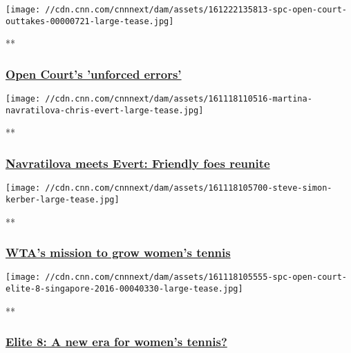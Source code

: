 \texttt{[image: //cdn.cnn.com/cnnnext/dam/assets/161222135813-spc-open-court-outtakes-00000721-large-tease.jpg]}

**

\hypertarget{open-courts-unforced-errors}{%
\subsubsection{\texorpdfstring{\href{/videos/sports/2016/12/22/spc-open-court-outtakes.cnn}{Open
Court's 'unforced
errors'}}{Open Court's 'unforced errors'}}\label{open-courts-unforced-errors}}

\href{/videos/sports/2016/11/18/spc-open-court-navratilova-evert.cnn}{}

\texttt{[image: //cdn.cnn.com/cnnnext/dam/assets/161118110516-martina-navratilova-chris-evert-large-tease.jpg]}

**

\hypertarget{navratilova-meets-evert-friendly-foes-reunite}{%
\subsubsection{\texorpdfstring{\href{/videos/sports/2016/11/18/spc-open-court-navratilova-evert.cnn}{Navratilova
meets Evert: Friendly foes
reunite}}{Navratilova meets Evert: Friendly foes reunite}}\label{navratilova-meets-evert-friendly-foes-reunite}}

\href{/videos/sports/2016/11/18/spc-open-court-steve-simon-interview.cnn}{}

\texttt{[image: //cdn.cnn.com/cnnnext/dam/assets/161118105700-steve-simon-kerber-large-tease.jpg]}

**

\hypertarget{wtas-mission-to-grow-womens-tennis}{%
\subsubsection{\texorpdfstring{\href{/videos/sports/2016/11/18/spc-open-court-steve-simon-interview.cnn}{WTA's
mission to grow women's
tennis}}{WTA's mission to grow women's tennis}}\label{wtas-mission-to-grow-womens-tennis}}

\href{/videos/sports/2016/11/18/spc-open-court-elite-8-singapore-2016.cnn}{}

\texttt{[image: //cdn.cnn.com/cnnnext/dam/assets/161118105555-spc-open-court-elite-8-singapore-2016-00040330-large-tease.jpg]}

**

\hypertarget{elite-8-a-new-era-for-womens-tennis}{%
\subsubsection{\texorpdfstring{\href{/videos/sports/2016/11/18/spc-open-court-elite-8-singapore-2016.cnn}{Elite
8: A new era for women's
tennis?}}{Elite 8: A new era for women's tennis?}}\label{elite-8-a-new-era-for-womens-tennis}}

